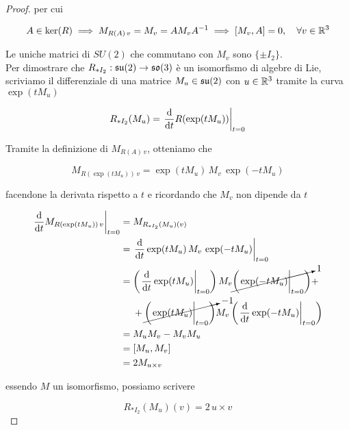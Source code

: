 \begin{proof}
	per cui
	
	\begin{equation}
		A \in \ker(R) \implies M_{R(A) \, v} = M_{v} = A M_{v} A^{-1} \implies [M_{v},A] = 0 \qcomma \forall v \in \R^{3}
	\end{equation}

	Le uniche matrici di $ SU(2) $ che commutano con $ M_{v} $ sono $ \{ \pm I_{2} \} $.\\
	Per dimostrare che $ R_{*I_{2}} : \mathfrak{su}(2) \to \mathfrak{so}(3) $ è un isomorfismo di algebre di Lie, scriviamo il differenziale di una matrice $ M_{u} \in \mathfrak{su}(2) $ con $ u \in \mathbb{R}^{3} $ tramite la curva $ \exp(t M_{u}) $
	
	\begin{equation}
			R_{*I_{2}}(M_{u}) = \eval{ \dv{t} R( \exp(t M_{u}) ) }_{t=0}
	\end{equation}
	
	Tramite la definizione di $ M_{R(A) \, v} $, otteniamo che
	
	\begin{equation}
		M_{R(\exp(t M_{u})) \, v} = \exp(t M_{u}) \, M_{v} \, \exp(-t M_{u})
	\end{equation}
	
	facendone la derivata rispetto a $ t $ e ricordando che $ M_{v} $ non dipende da $ t $
	
	\begin{align}
		\begin{split}
			\eval{ \dv{t} M_{R(\exp(t M_{u})) \, v} }_{t=0} &= M_{R_{*I_{2}}(M_{u}) (v)}\\
			&= \eval{ \dv{t} \exp(t M_{u}) \, M_{v} \, \exp(-t M_{u}) }_{t=0}\\
			&= \left( \eval{ \dv{t} \exp(t M_{u}) }_{t=0} \right) M_{v} \cancelto{1}{ \left( \eval{ \exp(-t M_{u}) }_{t=0} \right) } +\\
			& \hal + \cancelto{-1}{ \left( \eval{ \exp(t M_{u}) }_{t=0} \right) } M_{v} \left( \eval{ \dv{t} \exp(-t M_{u}) }_{t=0} \right)\\
			&= M_{u} M_{v} - M_{v} M_{u}\\
			&= [M_{u},M_{v}]\\
			&= 2 M_{u \times v}
		\end{split}
	\end{align}
	
	essendo $ M $ un isomorfismo, possiamo scrivere
	
	\begin{equation}
		R_{*I_{2}}(M_{u}) (v) = 2 \, u \times v
	\end{equation}
	

\end{proof}
